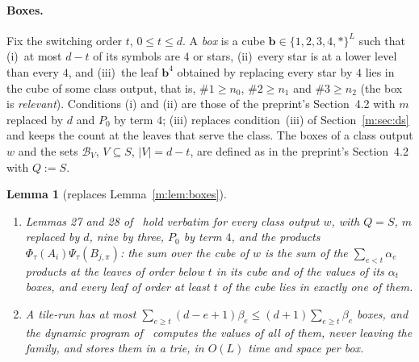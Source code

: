 \documentclass[11pt]{article}
\newtheorem{lemma}[theorem]{Lemma}
\theoremstyle{definition}
\theoremstyle{remark}
\begin{document}
\paragraph{Boxes.} Fix the switching order $t$, $0\le t\le d$. A \emph{box} is a cube $\mathbf b\in\{1,2,3,4,\ast\}^L$ such that (i)~at most $d-t$ of its symbols are $4$ or stars, (ii)~every star is at a lower level than every $4$, and (iii)~the leaf $\mathbf b^4$ obtained by replacing every star by $4$ lies in the cube of some class output, that is, $\#1\ge n_0$, $\#2\ge n_1$ and $\#3\ge n_2$ (the box is \emph{relevant}). Conditions (i) and (ii) are those of the preprint's Section~4.2 with $m$ replaced by $d$ and $P_0$ by term $4$; (iii) replaces condition~(iii) of Section~\ref{m:sec:ds} and keeps the count at the leaves that serve the class. The boxes of a class output $w$ and the sets $\mathcal B_V$, $V\subseteq S$, $|V|=d-t$, are defined as in the preprint's Section~4.2 with $Q:=S$.

\begin{lemma}[replaces Lemma~\ref{m:lem:boxes}]\label{t:lem:boxes}
\begin{enumerate}[label=(\alph*),nosep]
\item Lemmas 27 and 28 of~\cite{ZT} hold verbatim for every class output $w$, with $Q=S$, $m$ replaced by $d$, nine by three, $P_0$ by term $4$, and the products $\Phi_\tau(A_i)\Psi_\tau(B_{j,\pi})$: the sum over the cube of $w$ is the sum of the $\sum_{e<t}\alpha_e$ products at the leaves of order below $t$ in its cube and of the values of its $\alpha_t$ boxes, and every leaf of order at least $t$ of the cube lies in exactly one of them.
\item A tile-run has at most $\sum_{e\ge t}(d-e+1)\beta_e\le(d+1)\sum_{e\ge t}\beta_e$ boxes, and the dynamic program of~\cite[Lemma~29]{ZT} computes the values of all of them, never leaving the family, and stores them in a trie, in $O(L)$ time and space per box.
\end{enumerate}
\end{lemma}
\end{document}
